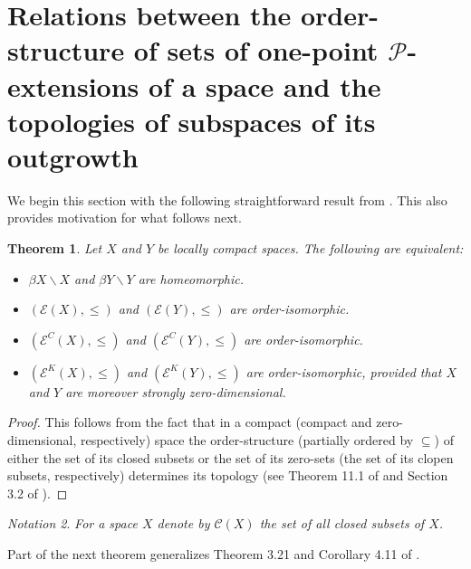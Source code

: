 \documentclass{amsart}
\newtheorem{theorem}{Theorem}[section]
\theoremstyle{definition}
\theoremstyle{remark}
\theoremstyle{notation}
\newtheorem{notation}[theorem]{Notation}
\numberwithin{equation}{section}
\begin{document}
\section{Relations between the order-structure of sets of one-point ${\mathcal P}$-extensions of a space  and the topologies  of subspaces of its outgrowth}

We begin this section with the following straightforward result from \cite{Ko2}. This   also provides motivation for what follows next.

\begin{theorem}\label{FSFH}
Let $X$ and $Y$ be locally compact spaces. The following are equivalent:
\begin{itemize}
\item[\rm(1)] $\beta X\backslash X$ and $\beta Y\backslash Y$ are homeomorphic.
\item[\rm(2)] $({\mathscr E}(X),\leq)$ and $({\mathscr E}(Y),\leq)$ are order-isomorphic.
\item[\rm(3)] $({\mathscr E}^C(X),\leq)$ and $({\mathscr E}^C(Y),\leq)$ are order-isomorphic.
\item[\rm(4)] $({\mathscr E}^K(X),\leq)$ and $({\mathscr E}^K(Y),\leq)$ are order-isomorphic, provided that $X$ and $Y$ are moreover strongly zero-dimensional.
\end{itemize}
\end{theorem}

\begin{proof}
This follows from the fact that in  a compact (compact and zero-dimensional, respectively) space the order-structure (partially ordered by $\subseteq$) of either the set of its closed subsets or the set of its zero-sets (the set of its  clopen subsets, respectively)  determines its topology  (see Theorem 11.1 of \cite{B} and Section 3.2 of \cite{PW}).
\end{proof}

\begin{notation}\label{HJFJB}
{\em For a space $X$ denote by ${\mathscr C}(X)$ the set of all closed subsets of $X$.}
\end{notation}

Part of the next theorem generalizes Theorem 3.21 and Corollary 4.11 of \cite{Ko2}.
\end{document}
